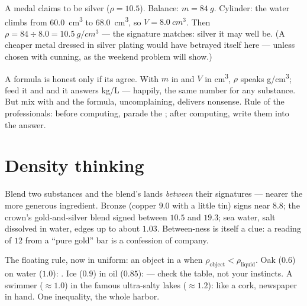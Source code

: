 \begin{example}\label{ex:g7:volume-mass-density:solid}
A medal claims to be silver ($\rho = 10.5$). Balance:
$m = \qty{84}{g}$. Cylinder: the water climbs from \qty{60.0}{cm^3} to
\qty{68.0}{cm^3}, so $V = \qty{8.0}{cm^3}$. Then
$\rho = 84 \div 8.0 = \qty{10.5}{g/cm^3}$ --- the signature
matches: silver it may well be. (A cheaper metal dressed in
silver plating would have betrayed itself here --- unless chosen
with cunning, as the weekend problem will show.)
\end{example}

\begin{remark}\label{rem:g7:volume-mass-density:units}
A formula is honest only if its  agree. With $m$ in 
and $V$ in \unit{cm^3}, $\rho$ speaks \unit{g/cm^3}; feed it
 and  and it answers \unit{kg/L} --- happily, the
same number for any substance. But mix  with  and the
formula, uncomplaining, delivers nonsense. Rule of the
professionals: before computing, parade the ; after
computing, write them into the answer.
\end{remark}

\section{Density thinking}

\begin{example}\label{ex:g7:volume-mass-density:alloys}
Blend two substances and the blend's  lands \emph{between}
their signatures --- nearer the more generous ingredient. Bronze
(copper $9.0$ with a little tin) signs near $8.8$; the crown's
gold-and-silver blend signed between $10.5$ and $19.3$; sea water,
salt dissolved in water, edges up to about $1.03$. Between-ness
is itself a clue: a reading of $12$ from a ``pure gold'' bar is a
confession of company.
\end{example}

\begin{example}\label{ex:g7:volume-mass-density:floating}
The floating rule, now in uniform: an object  in a 
when $\rho_{\text{object}} < \rho_{\text{liquid}}$. Oak ($0.6$)
on water ($1.0$): . Ice ($0.9$) in oil ($0.85$):  ---
check the table, not your instincts. A swimmer ($\approx 1.0$)
in the famous ultra-salty lakes ($\approx 1.2$):  like a
cork, newspaper in hand. One inequality, the whole harbor.
\end{example}

